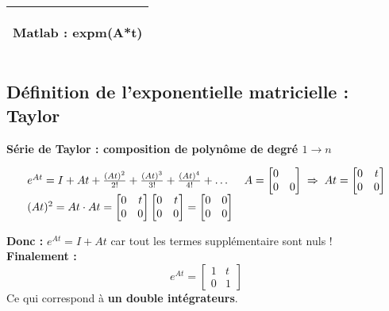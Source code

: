 \documentclass[document.tex]{subfiles}
\begin{document}
\begin{center}
\begin{tabular}{|c|}
\hline 
\begin{Large}
	Matlab : exp\textbf{m}(A*t)
\end{Large}
\\ \hline
\end{tabular}
\end{center}

\subsection{Définition de l'exponentielle matricielle : Taylor}

\textbf{Série de Taylor : composition de polynôme de degré $1 \rightarrow n$}

$$
\begin{array}{l l}
e^{At} = I + A t + \frac{(A t)^2}{2!} + \frac{(A t)^3}{3 !} + \frac{(A t)^4}{4 !} + \ldots &
A = \begin{bmatrix} 0 & \\ 0 & 0 \end{bmatrix} \; \Rightarrow \; A t = \begin{bmatrix} 0 & t \\ 0 & 0 \end{bmatrix} \\
(A t)^2 = A t \cdot A t = \begin{bmatrix} 0 & t \\ 0 & 0 \end{bmatrix} \begin{bmatrix} 0 & t \\ 0 & 0 \end{bmatrix}= \begin{bmatrix} 0 & 0 \\ 0 & 0 \end{bmatrix}
\end{array}
$$

\textbf{Donc : } $e^{A t} =  I + A t$ car tout les termes supplémentaire sont nuls !\\
\textbf{Finalement : }
\begin{equation}
\boxed{ e^{A t} = \begin{bmatrix} 1 & t \\ 0 & 1 \end{bmatrix} }
\end{equation}
Ce qui correspond à \textbf{un double intégrateurs}.\\
\end{document}
